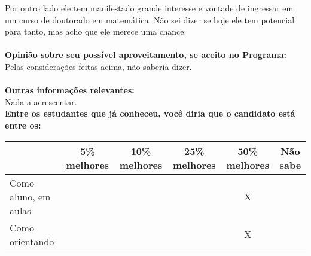 \documentclass[11pt]{article}
\begin{document}
Por outro lado ele tem manifestado grande interesse e vontade de ingressar em um curso de doutorado em matemática. Não sei dizer se hoje ele tem potencial para tanto, mas acho que ele merece uma chance.\\
\\
\textbf{Opinião sobre seu possível aproveitamento, se aceito no Programa:}
\\Pelas considerações feitas acima, não saberia dizer.\\ 
\\
\textbf{Outras informações relevantes:} \\Nada a acrescentar.
\\[0.3cm]
\textbf{Entre os estudantes que já conheceu, você diria que o candidato está entre os:}
\\
\begin{tabular}{|l|c|c|c|c|c|}
\hline
 & 5\% melhores & 10\% melhores & 25\% melhores & 50\% melhores & Não sabe \\
\hline
Como aluno, em aulas &  &  &  & X & \\
\hline
Como orientando &  &  &  & X & \\
\hline
\end{tabular}
\end{document}
